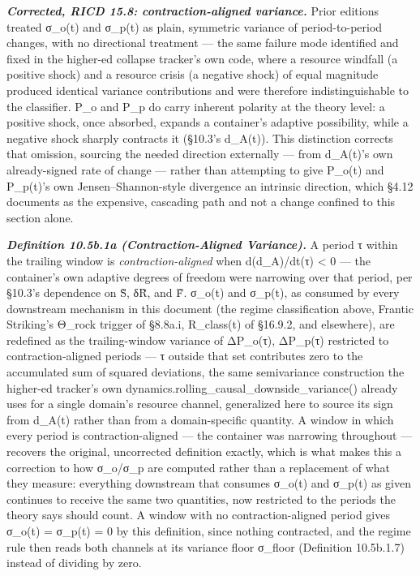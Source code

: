 \documentclass[
]{article}
\begin{document}
\emph{\textbf{Corrected, RICD 15.8: contraction-aligned variance.}}
Prior editions treated σ\_o(t) and σ\_p(t) as plain, symmetric variance
of period-to-period changes, with no directional treatment --- the same
failure mode identified and fixed in the higher-ed collapse tracker's
own code, where a resource windfall (a positive shock) and a resource
crisis (a negative shock) of equal magnitude produced identical variance
contributions and were therefore indistinguishable to the classifier.
P\_o and P\_p do carry inherent polarity at the theory level: a positive
shock, once absorbed, expands a container's adaptive possibility, while
a negative shock sharply contracts it (§10.3's d\_A(t)). This
distinction corrects that omission, sourcing the needed direction
externally --- from d\_A(t)'s own already-signed rate of change ---
rather than attempting to give P\_o(t) and P\_p(t)'s own
Jensen--Shannon-style divergence an intrinsic direction, which §4.12
documents as the expensive, cascading path and not a change confined to
this section alone.

\emph{\textbf{Definition 10.5b.1a (Contraction-Aligned Variance).}} A
period τ within the trailing window is \emph{contraction-aligned} when
d(d\_A)/dt(τ) \textless{} 0 --- the container's own adaptive degrees of
freedom were narrowing over that period, per §10.3's dependence on S̃,
δR̃, and F̃. σ\_o(t) and σ\_p(t), as consumed by every downstream
mechanism in this document (the regime classification above, Frantic
Striking's Θ\_rock trigger of §8.8a.i, R\_class(t) of §16.9.2, and
elsewhere), are redefined as the trailing-window variance of ΔP\_o(τ),
ΔP\_p(τ) restricted to contraction-aligned periods --- τ outside that
set contributes zero to the accumulated sum of squared deviations, the
same semivariance construction the higher-ed tracker's own
dynamics.rolling\_causal\_downside\_variance() already uses for a single
domain's resource channel, generalized here to source its sign from
d\_A(t) rather than from a domain-specific quantity. A window in which
every period is contraction-aligned --- the container was narrowing
throughout --- recovers the original, uncorrected definition exactly,
which is what makes this a correction to how σ\_o/σ\_p are computed
rather than a replacement of what they measure: everything downstream
that consumes σ\_o(t) and σ\_p(t) as given continues to receive the same
two quantities, now restricted to the periods the theory says should
count. A window with no contraction-aligned period gives σ\_o(t) =
σ\_p(t) = 0 by this definition, since nothing contracted, and the regime
rule then reads both channels at its variance floor σ\_floor (Definition
10.5b.1.7) instead of dividing by zero.
\end{document}
